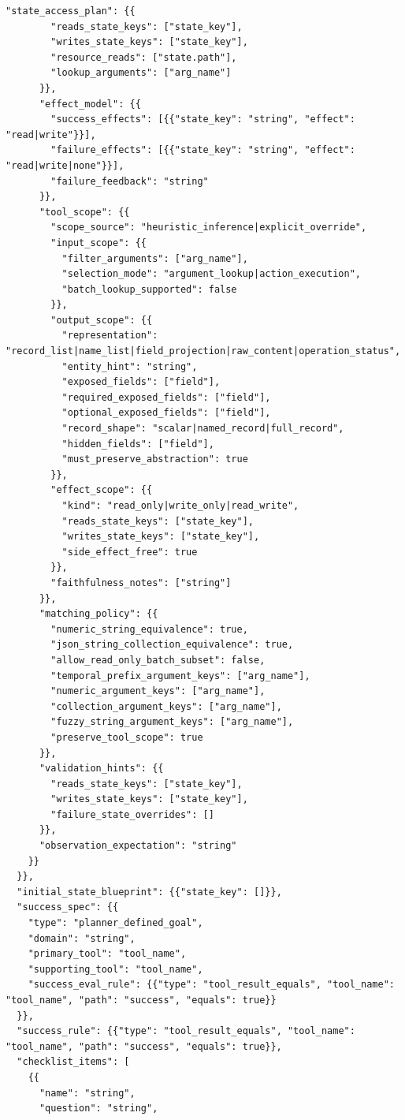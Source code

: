 \begin{tcolorbox}[promptbox,title={Task Planner Prompt}]
\begin{Verbatim}[breaklines=true, breakanywhere=true, fontsize=\scriptsize, breaksymbolleft={}]
      "state_access_plan": {{
        "reads_state_keys": ["state_key"],
        "writes_state_keys": ["state_key"],
        "resource_reads": ["state.path"],
        "lookup_arguments": ["arg_name"]
      }},
      "effect_model": {{
        "success_effects": [{{"state_key": "string", "effect": "read|write"}}],
        "failure_effects": [{{"state_key": "string", "effect": "read|write|none"}}],
        "failure_feedback": "string"
      }},
      "tool_scope": {{
        "scope_source": "heuristic_inference|explicit_override",
        "input_scope": {{
          "filter_arguments": ["arg_name"],
          "selection_mode": "argument_lookup|action_execution",
          "batch_lookup_supported": false
        }},
        "output_scope": {{
          "representation": "record_list|name_list|field_projection|raw_content|operation_status",
          "entity_hint": "string",
          "exposed_fields": ["field"],
          "required_exposed_fields": ["field"],
          "optional_exposed_fields": ["field"],
          "record_shape": "scalar|named_record|full_record",
          "hidden_fields": ["field"],
          "must_preserve_abstraction": true
        }},
        "effect_scope": {{
          "kind": "read_only|write_only|read_write",
          "reads_state_keys": ["state_key"],
          "writes_state_keys": ["state_key"],
          "side_effect_free": true
        }},
        "faithfulness_notes": ["string"]
      }},
      "matching_policy": {{
        "numeric_string_equivalence": true,
        "json_string_collection_equivalence": true,
        "allow_read_only_batch_subset": false,
        "temporal_prefix_argument_keys": ["arg_name"],
        "numeric_argument_keys": ["arg_name"],
        "collection_argument_keys": ["arg_name"],
        "fuzzy_string_argument_keys": ["arg_name"],
        "preserve_tool_scope": true
      }},
      "validation_hints": {{
        "reads_state_keys": ["state_key"],
        "writes_state_keys": ["state_key"],
        "failure_state_overrides": []
      }},
      "observation_expectation": "string"
    }}
  }},
  "initial_state_blueprint": {{"state_key": []}},
  "success_spec": {{
    "type": "planner_defined_goal",
    "domain": "string",
    "primary_tool": "tool_name",
    "supporting_tool": "tool_name",
    "success_eval_rule": {{"type": "tool_result_equals", "tool_name": "tool_name", "path": "success", "equals": true}}
  }},
  "success_rule": {{"type": "tool_result_equals", "tool_name": "tool_name", "path": "success", "equals": true}},
  "checklist_items": [
    {{
      "name": "string",
      "question": "string",

\end{Verbatim}
\end{tcolorbox}
